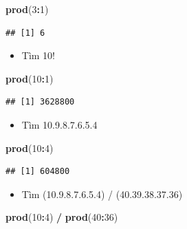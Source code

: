 \documentclass[
]{book}
\newenvironment{Shaded}{\begin{snugshade}}{\end{snugshade}}
\newcommand{\DecValTok}[1]{\textcolor[rgb]{0.00,0.00,0.81}{#1}}
\newcommand{\KeywordTok}[1]{\textcolor[rgb]{0.13,0.29,0.53}{\textbf{#1}}}
\newcommand{\NormalTok}[1]{#1}
\newcommand{\OperatorTok}[1]{\textcolor[rgb]{0.81,0.36,0.00}{\textbf{#1}}}
\newcommand{\StringTok}[1]{\textcolor[rgb]{0.31,0.60,0.02}{#1}}
\providecommand{\tightlist}{%
  \setlength{\itemsep}{0pt}\setlength{\parskip}{0pt}}
\begin{document}
\begin{Shaded}
\begin{Highlighting}[]
\KeywordTok{prod}\NormalTok{(}\DecValTok{3}\OperatorTok{:}\DecValTok{1}\NormalTok{)}
\end{Highlighting}
\end{Shaded}

\begin{verbatim}
## [1] 6
\end{verbatim}

\begin{itemize}
\tightlist
\item
  Tìm 10!
\end{itemize}

\begin{Shaded}
\begin{Highlighting}[]
\KeywordTok{prod}\NormalTok{(}\DecValTok{10}\OperatorTok{:}\DecValTok{1}\NormalTok{)}
\end{Highlighting}
\end{Shaded}

\begin{verbatim}
## [1] 3628800
\end{verbatim}

\begin{itemize}
\tightlist
\item
  Tìm 10.9.8.7.6.5.4
\end{itemize}

\begin{Shaded}
\begin{Highlighting}[]
\KeywordTok{prod}\NormalTok{(}\DecValTok{10}\OperatorTok{:}\DecValTok{4}\NormalTok{)}
\end{Highlighting}
\end{Shaded}

\begin{verbatim}
## [1] 604800
\end{verbatim}

\begin{itemize}
\tightlist
\item
  Tìm (10.9.8.7.6.5.4) / (40.39.38.37.36)
\end{itemize}

\begin{Shaded}
\begin{Highlighting}[]
\KeywordTok{prod}\NormalTok{(}\DecValTok{10}\OperatorTok{:}\DecValTok{4}\NormalTok{) }\OperatorTok{/}\StringTok{ }\KeywordTok{prod}\NormalTok{(}\DecValTok{40}\OperatorTok{:}\DecValTok{36}\NormalTok{)}
\end{Highlighting}
\end{Shaded}
\end{document}
